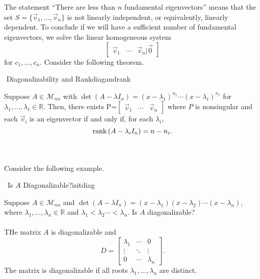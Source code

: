         \vphantom
        \\
        \\
        The statement ``There are less than \(n\) fundamental eigenvectors'' means that the set \(S=\{\vec{v}_1,\ldots,\vec{v}_n\}\) is not linearly independent, or equivalently, linearly dependent. To conclude if we will have a sufficient number of fundamental eigenvectors, we solve the linear homogeneous system
        \begin{equation*}
            \begin{bmatrix}
                \vec{v}_1 & \cdots & \vec{v}_n | \vec{0}
            \end{bmatrix}
        \end{equation*}
        for \(c_1,\ldots,c_n\). Consider the following theorem.
        \begin{theorem}{\Stop\,\,Diagonalizability and Rank}{diagandrank}
            
            Suppose \(A\in\mathcal{M}_{nn}\) with \(\det(A-\lambda I_n)=(x-\lambda_1)^{n_1}\cdots(x-\lambda_\ell)^{n_\ell}\) for 
            \(\lambda_1,\ldots,\lambda_\ell\in\mathbb{R}\). Then, there exists P=\(\begin{bmatrix} \vec{v}_1 & \cdots & \vec{v}_n \end{bmatrix}\) where \(P\) is nonsingular and each \(\vec{v}_i\) is an eigenvector if and only if, for each \(\lambda_i\),
            \begin{equation*}
                \text{rank\,}(A-\lambda_iI_n)=n-n_i.
            \end{equation*}
            
        \end{theorem}
        \pagebreak
        \vphantom
        \\
        \\
        Consider the following example.
        \begin{example}{\Difficulty\,\Difficulty\,\,Is \(A\) Diagonalizable?}{isitdiag}
            
            Suppose \(A\in\mathcal{M}_{nn}\) and \(\det(A-\lambda I_n)=(x-\lambda_1)(x-\lambda_2)\cdots(x-\lambda_n)\), where \(\lambda_1,\ldots,\lambda_n\in\mathbb{R}\) and \(\lambda_1<\lambda_2\cdots<\lambda_n\). Is \(A\) diagonalizable?
            \\
            \\
            THe matrix \(A\) is diagonalizable and
            \begin{equation*}
                D=\begin{bmatrix} 
                    \lambda_1 & \cdots & 0 \\
                    \vdots & \ddots & \vdots \\
                    0 & \cdots & \lambda_n
                \end{bmatrix}.
            \end{equation*}
            The matrix is diagonalizable if all roots \(\lambda_1,\ldots,\lambda_n\) are distinct.

        \end{example}
